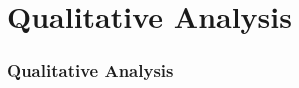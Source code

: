 \documentclass{beamer}
\begin{document}
\section{Qualitative Analysis}
\begin{frame}
   \frametitle{Qualitative Analysis}


\end{frame}
\end{document}
